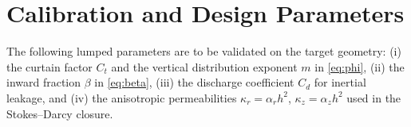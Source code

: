 \documentclass[11pt,a4paper]{article}
\begin{document}
\section{Calibration and Design Parameters}
The following lumped parameters are to be validated on the target geometry: (i) the curtain factor $C_t$ and the vertical distribution exponent $m$ in \eqref{eq:phi}, (ii) the inward fraction $\beta$ in \eqref{eq:beta}, (iii) the discharge coefficient $C_d$ for inertial leakage, and (iv) the anisotropic permeabilities $\kappa_r=\alpha_r h^2$, $\kappa_z=\alpha_z h^2$ used in the Stokes--Darcy closure.
\end{document}

